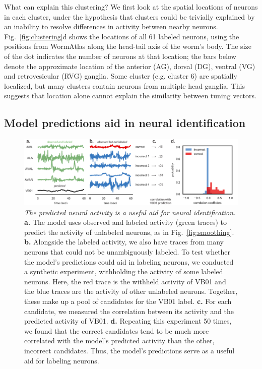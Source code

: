 \documentclass[11pt]{article}
\begin{document}
What can explain this clustering?  We first look at the spatial
locations of neurons in each cluster, under the hypothesis that
clusters could be trivially explained by an inability to resolve
differences in activity between nearby neurons.
Fig.~\ref{fig:clustering}d shows the locations of all 61 labeled
neurons, using the positions from WormAtlas along the
head-tail axis of the worm's body.  The size of the dot indicates the
number of neurons at that location; the bars below denote the
approximate location of the anterior (AG), dorsal (DG), ventral (VG)
and retrovesicular (RVG) ganglia.  Some cluster (e.g. cluster 6) are
spatially localized, but many clusters contain neurons from multiple
head ganglia.  This suggests that location alone cannot explain the
similarity between tuning vectors.




\subsection*{Model predictions aid in neural identification}

\begin{figure}[t!]
\centering
\includegraphics[width=6in]{figures/v3/figure_id} 
\caption{ \textit{The predicted neural activity is a useful aid for
    neural identification.}  \textbf{a.} The model uses observed and
  labeled activity (green traces) to predict the activity of unlabeled
  neurons, as in Fig.~\ref{fig:smoothing}. \textbf{b.} Alongside the
  labeled activity, we also have traces from many neurons that could
  not be unambiguously labeled. To test whether the model's
  predictions could aid in labeling neurons, we conducted a synthetic
  experiment, withholding the activity of some labeled neurons. Here,
  the red trace is the withheld activity of VB01 and the blue traces
  are the activity of other unlabeled neurons.  Together, these make
  up a pool of candidates for the VB01 label.  \textbf{c.} For each
  candidate, we measured the correlation between its activity and the
  predicted activity of VB01.  \textbf{d.} Repeating this experiment
  50 times, we found that the correct candidates tend to be much more
  correlated with the model's predicted activity than the other,
  incorrect candidates.  Thus, the model's predictions serve as a
  useful aid for labeling neurons.  }
\label{fig:id}
\end{figure}
\end{document}
